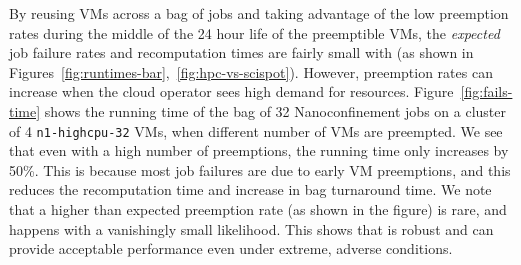 By reusing VMs across a bag of jobs and taking advantage of the low preemption rates during the middle of the 24 hour life of the preemptible VMs, the \emph{expected} job failure rates and recomputation times are fairly small with \sysname (as shown in Figures~\ref{fig:runtimes-bar},~\ref{fig:hpc-vs-scispot}).
However, preemption rates can increase when the cloud operator sees high demand for resources.
Figure~\ref{fig:fails-time} shows the running time of the bag of 32 Nanoconfinement jobs on a cluster of 4 \texttt{n1-highcpu-32} VMs, when different number of VMs are preempted. 
%
We see that even with a high number of preemptions, the running time only increases by 50\%.
This is because most job failures are due to early VM preemptions, and this reduces the recomputation time and increase in bag turnaround time. 
We note that a higher than expected preemption rate (as shown in the figure) is rare, and happens with a vanishingly small likelihood. 
This shows that \sysname is robust and can provide acceptable performance even under extreme, adverse conditions. 








